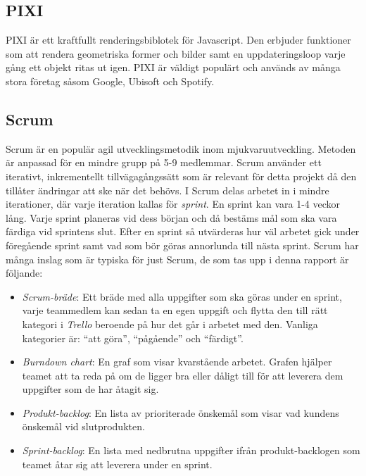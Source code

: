\subsection*{PIXI}
PIXI är ett kraftfullt renderingsbiblotek för Javascript.\cite{Pixi} Den erbjuder funktioner som att rendera geometriska former och bilder samt en uppdateringsloop varje gång ett objekt ritas ut igen. PIXI är väldigt populärt och används av många stora företag såsom Google, Ubisoft och Spotify. 

\subsection*{Scrum}
Scrum är en populär agil utvecklingsmetodik inom mjukvaruutveckling. Metoden är anpassad för en mindre grupp på 5-9 medlemmar. Scrum använder ett iterativt, inkrementellt tillvägagångssätt som är relevant för detta projekt då den tillåter ändringar att ske när det behövs\cite{TheScrum}. I Scrum delas arbetet in i mindre iterationer, där varje iteration kallas för \textit{sprint}. En sprint kan vara 1-4 veckor lång. Varje sprint planeras vid dess början och då bestäms mål som ska vara färdiga vid sprintens slut. Efter en sprint så utvärderas hur väl arbetet gick under föregående sprint samt vad som bör göras annorlunda till nästa sprint. Scrum har många inslag som är typiska för just Scrum, de som tas upp i denna rapport är följande:

\begin{itemize}
	\item \textit{Scrum-bräde}: Ett bräde med alla uppgifter som ska göras under en sprint, varje teammedlem kan sedan ta en egen uppgift och flytta den till rätt kategori i \textit{Trello} beroende på hur det går i arbetet med den. Vanliga kategorier är: ``att göra'', ``pågående'' och ``färdigt''.
	
	\item \textit{Burndown chart}: En graf som visar kvarstående arbetet. Grafen hjälper teamet att ta reda på om de ligger bra eller dåligt till för att leverera dem uppgifter som de har åtagit sig. 
	
	\item \textit{Produkt-backlog}: En lista av prioriterade önskemål som visar vad kundens önskemål vid slutprodukten.
	
	\item \textit{Sprint-backlog}: En lista med nedbrutna uppgifter ifrån produkt-backlogen som teamet åtar sig att leverera under en sprint. 	
	
\end{itemize}


